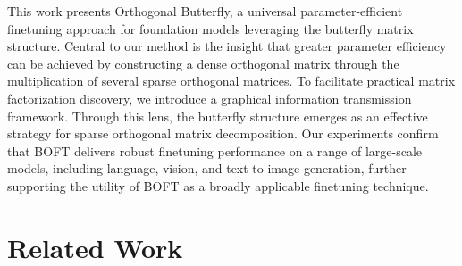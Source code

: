 This work presents Orthogonal Butterfly, a universal parameter-efficient finetuning approach for foundation models leveraging the butterfly matrix structure. Central to our method is the insight that greater parameter efficiency can be achieved by constructing a dense orthogonal matrix through the multiplication of several sparse orthogonal matrices. To facilitate practical matrix factorization discovery, we introduce a graphical information transmission framework. Through this lens, the butterfly structure emerges as an effective strategy for sparse orthogonal matrix decomposition. Our experiments confirm that BOFT delivers robust finetuning performance on a range of large-scale models, including language, vision, and text-to-image generation, further supporting the utility of BOFT as a broadly applicable finetuning technique.

\section{Related Work}